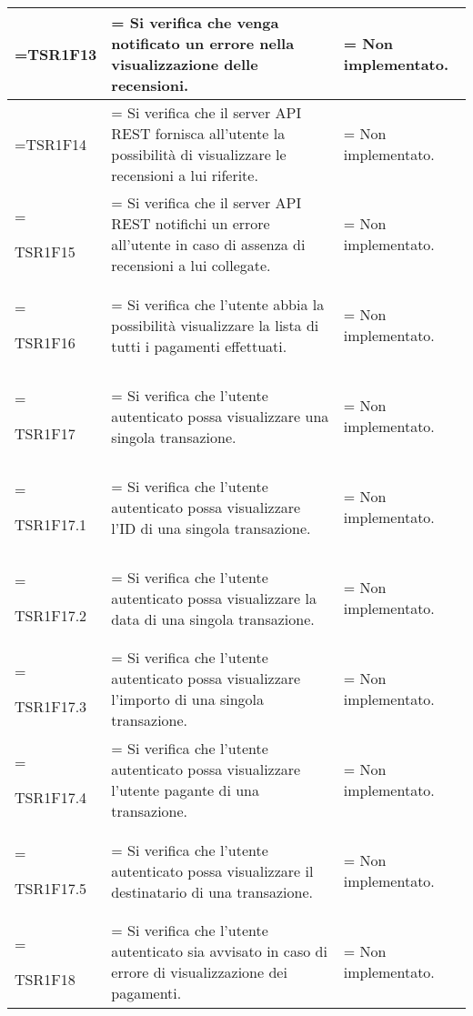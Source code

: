 \begin{xltabular}{\textwidth} {
            >{\hsize\linewidth=\hsize}X
            >{\hsize\linewidth=\hsize}X
            >{\hsize\linewidth=\hsize}X
        }
        TSR1F13 &
        Si verifica che venga notificato un errore nella visualizzazione delle recensioni.  &
        Non implementato.
        \\ \hline

        TSR1F14 &
        Si verifica che il server API REST fornisca all'utente la possibilità di visualizzare le recensioni a lui riferite. &
        Non implementato.
        \\ \hline

        TSR1F15 &
        Si verifica che il server API REST notifichi un errore all'utente in caso di assenza di recensioni a lui collegate. &
        Non implementato.
        \\ \hline


        TSR1F16 &
        Si verifica che l'utente abbia la possibilità visualizzare la lista di tutti i pagamenti
        effettuati. &
        Non implementato.
        \\ \hline

        TSR1F17 &
        Si verifica che l'utente autenticato possa visualizzare una singola transazione. &
        Non implementato.
        \\ \hline

        TSR1F17.1 &
        Si verifica che l'utente autenticato possa visualizzare l'ID di una singola transazione. &
        Non implementato.
        \\ \hline


        TSR1F17.2 &
        Si verifica che l'utente autenticato possa visualizzare la data di una singola transazione. &
        Non implementato.
        \\ \hline

        TSR1F17.3 &
        Si verifica che l'utente autenticato possa visualizzare l'importo di una singola transazione. &
        Non implementato.
        \\ \hline

        TSR1F17.4 &
        Si verifica che l'utente autenticato possa visualizzare l'utente pagante di una transazione. &
        Non implementato.
        \\ \hline

        TSR1F17.5 &
        Si verifica che l'utente autenticato possa visualizzare il destinatario di una transazione. &
        Non implementato.
        \\ \hline

        TSR1F18 &
        Si verifica che l'utente autenticato sia avvisato in caso di errore di visualizzazione dei pagamenti. &
        Non implementato.
        \\ \hline


\end{xltabular}
